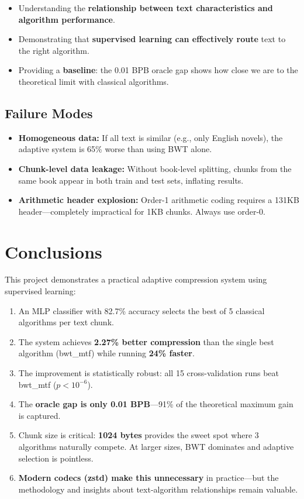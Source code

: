 \documentclass[12pt,a4paper]{article}
\begin{document}
\begin{itemize}[nosep]
    \item Understanding the \textbf{relationship between text characteristics and algorithm performance}.
    \item Demonstrating that \textbf{supervised learning can effectively route} text to the right algorithm.
    \item Providing a \textbf{baseline}: the 0.01 BPB oracle gap shows how close we are to the theoretical limit with classical algorithms.
\end{itemize}

\subsection{Failure Modes}

\begin{itemize}[nosep]
    \item \textbf{Homogeneous data:} If all text is similar (e.g., only English novels), the adaptive system is 65\% worse than using BWT alone.
    \item \textbf{Chunk-level data leakage:} Without book-level splitting, chunks from the same book appear in both train and test sets, inflating results.
    \item \textbf{Arithmetic header explosion:} Order-1 arithmetic coding requires a 131KB header---completely impractical for 1KB chunks. Always use order-0.
\end{itemize}

\section{Conclusions}

This project demonstrates a practical adaptive compression system using supervised learning:

\begin{enumerate}[nosep]
    \item An MLP classifier with 82.7\% accuracy selects the best of 5 classical algorithms per text chunk.
    \item The system achieves \textbf{2.27\% better compression} than the single best algorithm (bwt\_mtf) while running \textbf{24\% faster}.
    \item The improvement is statistically robust: all 15 cross-validation runs beat bwt\_mtf ($p < 10^{-6}$).
    \item The \textbf{oracle gap is only 0.01 BPB}---91\% of the theoretical maximum gain is captured.
    \item Chunk size is critical: \textbf{1024 bytes} provides the sweet spot where 3 algorithms naturally compete. At larger sizes, BWT dominates and adaptive selection is pointless.
    \item \textbf{Modern codecs (zstd) make this unnecessary} in practice---but the methodology and insights about text-algorithm relationships remain valuable.
\end{enumerate}
\end{document}
